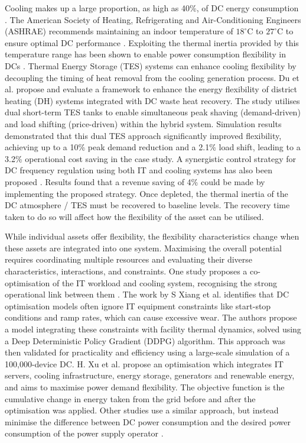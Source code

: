 \documentclass[lettersize,journal]{IEEEtran}
\begin{document}
Cooling makes up a large proportion, as high as 40\%, of DC energy consumption \cite{zhao2021synthetic}.  The American Society of Heating, Refrigerating and Air-Conditioning Engineers (ASHRAE) recommends maintaining an indoor temperature of $18^\circ\mathrm{C}$ to $27^\circ\mathrm{C}$ to ensure optimal DC performance \cite{tc2016data}. Exploiting the thermal inertia provided by this temperature range has been shown to enable power consumption flexibility in DCs \cite{takci2025data}\cite{ref22}. Thermal Energy Storage (TES) systems can enhance cooling flexibility by decoupling the timing of heat removal from the cooling generation process.
Du et al. \cite{du2025new} propose and evaluate a framework to enhance the energy flexibility of district heating (DH) systems integrated with DC waste heat recovery. The study utilises dual short-term TES tanks to enable simultaneous peak shaving (demand-driven) and load shifting (price-driven) within the hybrid system. Simulation results demonstrated that this dual TES approach significantly improved flexibility, achieving up to a 10\% peak demand reduction and a 2.1\% load shift, leading to a 3.2\% operational cost saving in the case study. A synergistic control strategy for DC frequency regulation using both IT and cooling systems has also been proposed \cite{Fu2020ApEn}. Results found that a revenue saving of 4\% could be made by implementing the proposed strategy. Once depleted, the thermal inertia of the DC atmosphere / TES must be recovered to baseline levels. The recovery time taken to do so will affect how the flexibility of the asset can be utilised.


While individual assets offer flexibility, the flexibility characteristics change when these assets are integrated into one system. Maximising the overall potential requires coordinating multiple resources and evaluating their diverse characteristics, interactions, and constraints. One study proposes a co-optimisation of the IT workload and cooling system, recognising the strong operational link between them \cite{Fu2020ApEn}. The work by S Xiang et al. \cite{xiang2023modeling} identifies that DC optimisation models often ignore IT equipment constraints like start-stop conditions and ramp rates, which can cause excessive wear. The authors propose a model integrating these constraints with facility thermal dynamics, solved using a Deep Deterministic Policy Gradient (DDPG) algorithm. This approach was then validated for practicality and efficiency using a large-scale simulation of a 100,000-device DC.
H. Xu et al. \cite{Xu2023SPIE} propose an optimisation which integrates IT servers, cooling infrastructure, energy storage, generators and renewable energy, and aims to maximise power demand flexibility. The objective function is the cumulative change in energy taken from the grid before and after the optimisation was applied.
Other studies use a similar approach, but instead minimise the difference between DC power consumption and the desired power consumption of the power supply operator \cite{cioara2018optimized}. 
\end{document}
